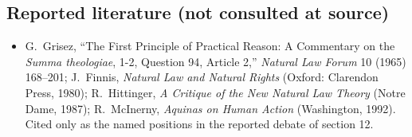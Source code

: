 \subsection*{Reported literature (not consulted at source)}

\begin{itemize}
\item G.~Grisez, ``The First Principle of Practical Reason: A Commentary on the \emph{Summa theologiae}, 1-2, Question 94, Article 2,'' \emph{Natural Law Forum} 10 (1965) 168--201; J.~Finnis, \emph{Natural Law and Natural Rights} (Oxford: Clarendon Press, 1980); R.~Hittinger, \emph{A Critique of the New Natural Law Theory} (Notre Dame, 1987); R.~McInerny, \emph{Aquinas on Human Action} (Washington, 1992). Cited only as the named positions in the reported debate of section 12.
\end{itemize}
\endgroup
